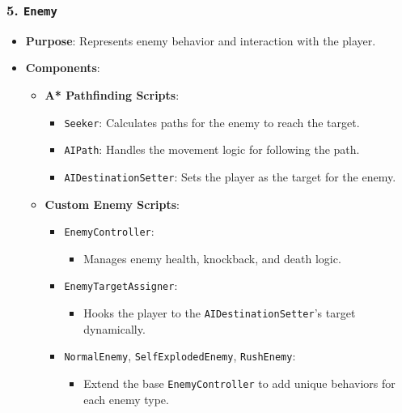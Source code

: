 \documentclass[10pt,twocolumn]{article}
\begin{document}
\subsubsection{5. \texttt{Enemy}}
\begin{itemize}
    \item \textbf{Purpose}: Represents enemy behavior and interaction with the player.
    \item \textbf{Components}:
    \begin{itemize}
        \item \textbf{A* Pathfinding Scripts}:
        \begin{itemize}
            \item \texttt{Seeker}: Calculates paths for the enemy to reach the target.
            \item \texttt{AIPath}: Handles the movement logic for following the path.
            \item \texttt{AIDestinationSetter}: Sets the player as the target for the enemy.
        \end{itemize}
        \item \textbf{Custom Enemy Scripts}:
        \begin{itemize}
            \item \texttt{EnemyController}:
            \begin{itemize}
                \item Manages enemy health, knockback, and death logic.
            \end{itemize}
            \item \texttt{EnemyTargetAssigner}:
            \begin{itemize}
                \item Hooks the player to the \texttt{AIDestinationSetter}'s target dynamically.
            \end{itemize}
            \item \texttt{NormalEnemy}, \texttt{SelfExplodedEnemy}, \texttt{RushEnemy}:
            \begin{itemize}
                \item Extend the base \texttt{EnemyController} to add unique behaviors for each enemy type.
            \end{itemize}
        \end{itemize}
    \end{itemize}
\end{itemize}
\end{document}

